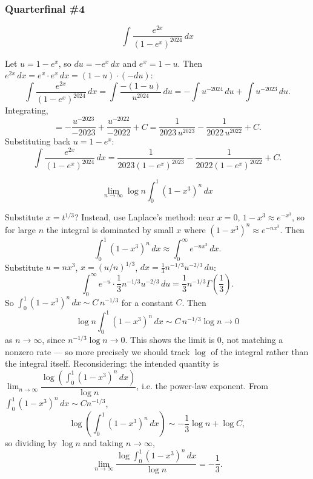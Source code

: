 \subsubsection*{Quarterfinal \#4}
\begin{questions}

\question
\[ \int \frac{e^{2x}}{(1-e^x)^{2024}}\,dx \]
\begin{solution}
Let $u = 1-e^x$, so $du = -e^x\,dx$ and $e^x = 1-u$. Then $e^{2x}\,dx = e^x\cdot e^x\,dx = (1-u)\cdot(-du)$:
\[ \int \frac{e^{2x}}{(1-e^x)^{2024}}\,dx = \int \frac{-(1-u)}{u^{2024}}\,du = -\int u^{-2024}\,du + \int u^{-2023}\,du. \]
Integrating,
\[ = -\frac{u^{-2023}}{-2023} + \frac{u^{-2022}}{-2022} + C = \frac{1}{2023\,u^{2023}} - \frac{1}{2022\,u^{2022}} + C. \]
Substituting back $u=1-e^x$:
\[ \int \frac{e^{2x}}{(1-e^x)^{2024}}\,dx = \frac{1}{2023(1-e^x)^{2023}} - \frac{1}{2022(1-e^x)^{2022}} + C. \]
\end{solution}

\question
\[ \lim_{n\to\infty} \log n \int_0^1 (1-x^3)^n\,dx \]
\begin{solution}
Substitute $x = t^{1/3}$? Instead, use Laplace's method: near $x=0$, $1-x^3\approx e^{-x^3}$, so for large $n$ the integral is dominated by small $x$ where $(1-x^3)^n \approx e^{-nx^3}$. Then
\[ \int_0^1 (1-x^3)^n\,dx \approx \int_0^\infty e^{-nx^3}\,dx. \]
Substitute $u = nx^3$, $x = (u/n)^{1/3}$, $dx = \frac{1}{3}n^{-1/3}u^{-2/3}\,du$:
\[ \int_0^\infty e^{-u}\cdot\frac13 n^{-1/3}u^{-2/3}\,du = \frac{1}{3}n^{-1/3}\Gamma\!\left(\frac13\right). \]
So $\int_0^1(1-x^3)^n\,dx \sim C\,n^{-1/3}$ for a constant $C$. Then
\[ \log n \int_0^1(1-x^3)^n\,dx \sim C\,n^{-1/3}\log n \to 0 \]
as $n \to \infty$, since $n^{-1/3}\log n \to 0$. This shows the limit is $0$, not matching a nonzero rate — so more precisely we should track $\log$ of the integral rather than the integral itself. Reconsidering: the intended quantity is $\lim_{n\to\infty} \dfrac{\log\left(\int_0^1(1-x^3)^n\,dx\right)}{\log n}$, i.e. the power-law exponent. From $\int_0^1(1-x^3)^n\,dx \sim C n^{-1/3}$,
\[ \log\left(\int_0^1 (1-x^3)^n\,dx\right) \sim -\frac13 \log n + \log C, \]
so dividing by $\log n$ and taking $n\to\infty$,
\[ \lim_{n\to\infty}\frac{\log\int_0^1(1-x^3)^n\,dx}{\log n} = -\frac13. \]
\end{solution}


\end{questions}
